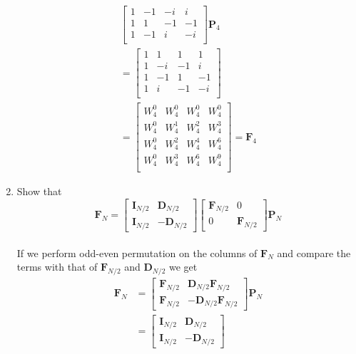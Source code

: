\documentclass[journal,12pt,twocolumn]{IEEEtran}
\let\vec\mathbf
\renewcommand\thesection{\arabic{section}}
\begin{document}
\begin{enumerate}[label=\arabic*.,ref=\thesection.\theenumi]
\begin{align}
\begin{bmatrix}
			1	&	-1	&	-i	&	i\\
			1	&	1	&	-1	&	-1\\
			1	&	-1	&	i	&	-i\\
		\end{bmatrix}\vec{P}_{4}\\
		=\begin{bmatrix}
			1	&	1	&	1	&	1\\
			1	&	-i	&	-1	&	i\\
			1	&	-1	&	1	&	-1\\
			1	&	i	&	-1	&	-i\\
		\end{bmatrix}\\
		= \begin{bmatrix}
			W_{4}^0	&	W_{4}^0	&	W_{4}^0	&	W_{4}^0\\
			W_{4}^0	&	W_{4}^1	&	W_{4}^2	&	W_{4}^3\\
			W_{4}^0	&	W_{4}^2	&	W_{4}^4	&	W_{4}^6\\
			W_{4}^0	&	W_{4}^3	&	W_{4}^6	&	W_{4}^9\\
		\end{bmatrix} = \vec{F}_{4}
	\end{align}
	\item Show that 
	\begin{equation}
		\vec{F}_{N}=
		\begin{bmatrix}
			\vec{I}_{N/2} & \vec{D}_{N/2} \\
			\vec{I}_{N/2} & -\vec{D}_{N/2}
		\end{bmatrix}
		\begin{bmatrix}
			\vec{F}_{N/2} & 0 \\
			0 & \vec{F}_{N/2}
		\end{bmatrix}
		\vec{P}_{N}
	\end{equation}
	\solution\\
	If we perform odd-even permutation on the columns of $\vec{F}_{N}$ and compare the terms with that of $\vec{F}_{N/2}$ and $\vec{D}_{N/2}$ we get
	\begin{align}
		\vec{F}_{N}&=
		\begin{bmatrix}
			\vec{F}_{N/2} & \vec{D}_{N/2}\vec{F}_{N/2} \\
			\vec{F}_{N/2} & -\vec{D}_{N/2}\vec{F}_{N/2}
		\end{bmatrix}
		\vec{P}_{N}\\
		&=\begin{bmatrix}
			\vec{I}_{N/2} & \vec{D}_{N/2} \\
			\vec{I}_{N/2} & -\vec{D}_{N/2}
		\end{bmatrix}

\end{align}
\end{enumerate}
\end{document}
